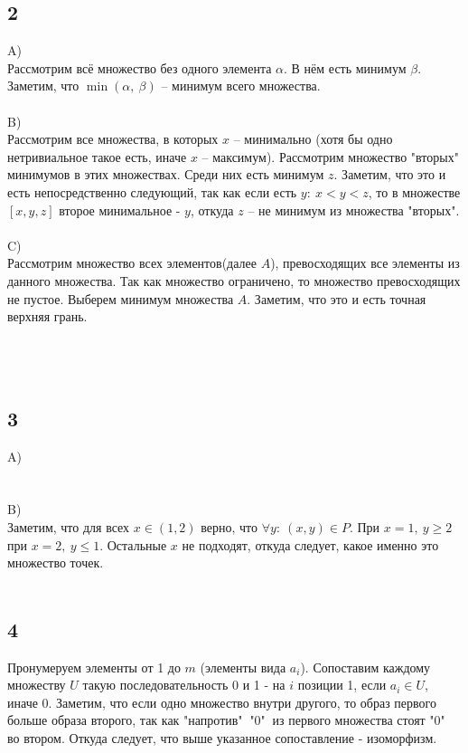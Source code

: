 		\subsection{2}
		A)\\
		Рассмотрим всё множество без одного элемента $\alpha$. В нём есть минимум $\beta$. Заметим, что $\min{(\alpha,\: \beta)}$ -- минимум всего множества.\\ \\
		B)\\
		Рассмотрим все множества, в которых $x$ -- минимально (хотя бы одно нетривиальное такое есть, иначе $x$ -- максимум). Рассмотрим множество "вторых" минимумов в этих множествах. Среди них есть минимум $z$. Заметим, что это и есть непосредственно следующий, так как если есть $y: \: x < y < z$, то в множестве $[x,y,z]$ второе минимальное - $y$, откуда $z$ -- не минимум из множества "вторых".\\ \\
		C)\\
		Рассмотрим множество всех элементов(далее $A$), превосходящих все элементы из данного множества. Так как множество ограничено, то множество превосходящих не пустое. Выберем минимум множества $A$. Заметим, что это и есть точная верхняя грань.\\ \\
		\\ \\
		\subsection{3}
		A)\\
		\\ \\
		B)\\
		Заметим, что для всех $x \in (1,2)$ верно, что $\forall y: \: (x,y) \in P$. При $x = 1,\: y \geqslant 2$ при $x = 2,\: y \leqslant 1$. Остальные $x$ не подходят, откуда следует, какое именно это множество точек.
		\\ \\
		\subsection{4}
		Пронумеруем элементы от 1 до $m$ (элементы вида $a_i$). Сопоставим каждому множеству $U$ такую последовательность 0 и 1 - на $i$ позиции 1, если $a_i \in U$, иначе 0. Заметим, что если одно множество внутри другого, то образ первого больше образа второго, так как "напротив" $\ $"0" $\ $из первого множества стоят "0" $\ $во втором. Откуда следует, что выше указанное сопоставление - изоморфизм.
		\\ \\
